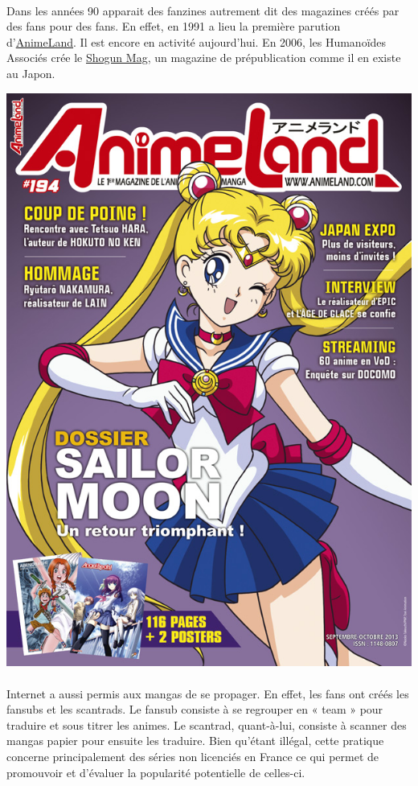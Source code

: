 \paragraph{}
Dans les années 90 apparait des fanzines autrement dit des magazines créés par des fans pour des fans. En effet, en 1991 a lieu la première parution d’\underline{AnimeLand}. Il est encore en activité aujourd’hui. En 2006, les Humanoïdes Associés crée le \underline{Shogun Mag}, un magazine de prépublication comme il en existe au Japon. 
\begin{center}
\includegraphics[scale=0.8]{animeland.jpg}
\end{center}
\paragraph{}
Internet a aussi permis aux mangas de se propager. En effet, les fans ont créés les fansubs et les scantrads. Le fansub consiste à se regrouper en « team » pour traduire et sous titrer les animes. Le scantrad, quant-à-lui, consiste à scanner des mangas papier pour ensuite les traduire. Bien qu’étant illégal, cette pratique concerne principalement des séries non licenciés en France ce qui permet de promouvoir et d’évaluer la popularité potentielle de celles-ci.

